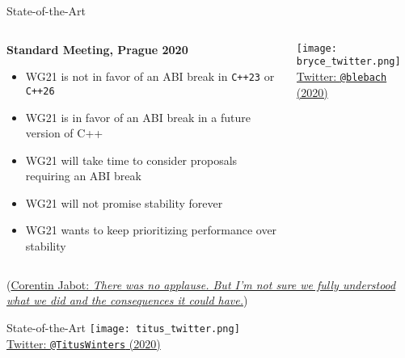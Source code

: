 \begin{frame}{State-of-the-Art}
    \begin{columns}
        \begin{column}{.45\textwidth}
            \textbf{Standard Meeting, Prague 2020}
            \begin{itemize}
                \item WG21 is not in favor of an ABI break in \texttt{C++23} or \texttt{C++26}
                \item WG21 is in favor of an ABI break in a future version of C++
                \item WG21 will take time to consider proposals requiring an ABI break 
                \item WG21 will not promise stability forever
                \item WG21 wants to keep prioritizing performance over stability
            \end{itemize}
        \end{column}
        \begin{column}{.45\textwidth}
            \centering
            \texttt{[image: bryce\_twitter.png]}\\
            {\footnotesize \href{https://twitter.com/blelbach/status/1228962495865507840}{Twitter: \texttt{@blebach} (2020)}}

        \end{column}
    \end{columns}

    \vspace*{5mm}

    (\href{https://cor3ntin.github.io/posts/abi/}{Corentin Jabot: \textit{There was no applause. But I’m not sure we fully understood what we did and the consequences it could have.}})
\end{frame}

\begin{frame}{State-of-the-Art}
    \centering
    \texttt{[image: titus\_twitter.png]}\\
    {\footnotesize \href{https://twitter.com/TitusWinters/status/1224377740306132998}{Twitter: \texttt{@TitusWinters} (2020)}}
\end{frame}

